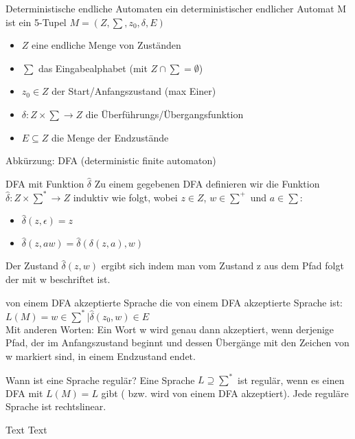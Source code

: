 \documentclass[avery5371]{flashcards}
\begin{document}
\begin{flashcard}[Definition]{Deterministische endliche Automaten}
    ein deterministischer endlicher Automat M ist ein 5-Tupel $M=(Z, \sum, z_0, \delta, E)$
\begin{itemize}
    \item $Z$ eine endliche Menge von Zuständen
    \item $\sum$ das Eingabealphabet (mit $Z\cap\sum = \emptyset$)
    \item $z_0\in Z$ der Start/Anfangszustand (max Einer)
    \item $\delta: Z \times \sum \rightarrow Z$ die Überführungs/Übergangsfunktion
    \item $E\subseteq Z$ die Menge der Endzustände
\end{itemize}
Abkürzung: DFA (deterministic finite automaton)
\end{flashcard}

\begin{flashcard}[Definition]{DFA mit Funktion $\hat{\delta}$}
    Zu einem gegebenen DFA definieren wir die Funktion $\hat{\delta}: Z \times \sum^* \rightarrow Z$ induktiv wie folgt, wobei $z\in Z$, $w\in\sum^+$ und $a\in \sum$:
    \begin{itemize}
        \item $\hat{\delta}(z, \epsilon) = z$
        \item $\hat{\delta}(z,aw)= \hat{\delta}(\delta(z,a),w)$
    \end{itemize}
    Der Zustand $\hat{\delta}(z,w)$ ergibt sich indem man vom Zustand z aus dem Pfad folgt der mit w beschriftet ist.
\end{flashcard}


\begin{flashcard}[Definition]{von einem DFA akzeptierte Sprache}
    die von einem DFA akzeptierte Sprache ist: $L(M)={w\in\sum^* | \hat{\delta}(z_0,w)\in E}$\\
    Mit anderen Worten: Ein Wort w wird genau dann akzeptiert, wenn derjenige Pfad, der im Anfangszustand beginnt und dessen Übergänge mit den Zeichen von w markiert sind, in einem Endzustand endet.
\end{flashcard}


\begin{flashcard}[Definition]{Wann ist eine Sprache regulär?}
    Eine Sprache $L \supseteq \sum^*$ ist regulär, wenn es einen DFA mit $L(M)=L$ gibt ( bzw. wird von einem DFA akzeptiert).  Jede reguläre Sprache ist rechtslinear.
\end{flashcard}

\begin{flashcard}[Definition]{Text}
    Text
\end{flashcard}
\end{document}
